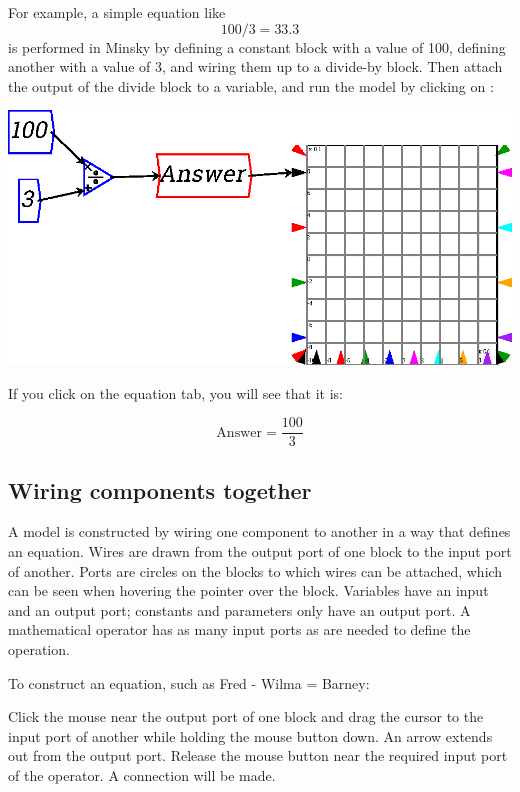 For example, a simple equation like
\begin{displaymath}
100/3 = 33.3
\end{displaymath}
is performed in Minsky by defining a constant block with a value of 100, defining another with a value of 3, and wiring them up to a divide-by block. Then attach the output of the divide block to a variable, and run the model by clicking on :

\begin{center}
  \includegraphics{images/NewItem129.eps}
\end{center}

If you click on the equation tab, you will see that it is:

\begin{displaymath}
\mathrm{Answer}=\frac{100}{3}
\end{displaymath}

\subsection{Wiring components together}

A model is constructed by wiring one component to another in a way that defines an equation. Wires are drawn from the output port of one block to the input port of another. Ports are circles on the blocks to which wires can be attached, which can be seen when hovering the pointer over the block. Variables have an input and an output port; constants and parameters only have an output port. A mathematical operator has as many input ports as are needed to define the operation.

To construct an equation, such as Fred - Wilma = Barney:

Click the mouse near the output port of one block and drag the cursor to the input port of another while holding the mouse button down. An arrow extends out from the output port. Release the mouse button near the required input port of the operator. A connection will be made.

